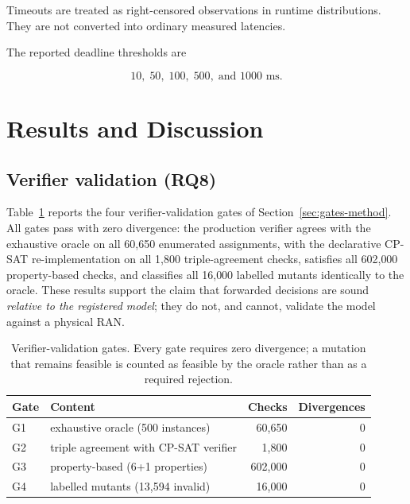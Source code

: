 \documentclass[pdflatex,sn-mathphys-num,iicol,oneside]{sn-jnl}
\begin{document}
Timeouts are treated as right-censored observations in runtime
distributions. They are not converted into ordinary measured
latencies.

The reported deadline thresholds are

\begin{equation}
10,\;50,\;100,\;500,\;\text{and }1000\text{ ms}.
\end{equation}

\section{Results and Discussion}
\label{sec:results}

\subsection{Verifier validation (RQ8)}

Table~\ref{tab:gates} reports the four verifier-validation gates of
Section~\ref{sec:gates-method}. All gates pass with zero divergence:
the production verifier agrees with the exhaustive oracle on all
60{,}650 enumerated assignments, with the declarative CP-SAT
re-implementation on all 1{,}800 triple-agreement checks, satisfies
all 602{,}000 property-based checks, and classifies all 16{,}000
labelled mutants identically to the oracle. These results support the
claim that forwarded decisions are sound \emph{relative to the
registered model}; they do not, and cannot, validate the model against
a physical RAN.

\begin{table}[t]
\centering
\caption{Verifier-validation gates. Every gate requires zero
divergence; a mutation that remains feasible is counted as feasible by
the oracle rather than as a required rejection.}
\label{tab:gates}
\setlength{\tabcolsep}{4pt}\small
\begin{tabular}{llrr}
\toprule
Gate & Content & Checks & Divergences\\
\midrule
G1 & exhaustive oracle (500 instances) & 60{,}650 & 0\\
G2 & triple agreement with CP-SAT verifier & 1{,}800 & 0\\
G3 & property-based (6+1 properties) & 602{,}000 & 0\\
G4 & labelled mutants (13{,}594 invalid) & 16{,}000 & 0\\
\bottomrule
\end{tabular}
\normalsize
\end{table}
\end{document}
